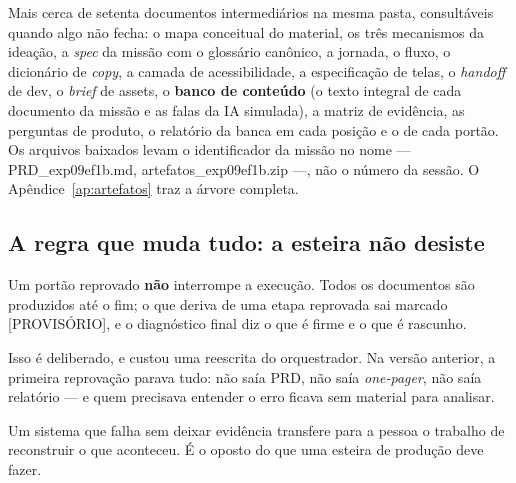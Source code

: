 \documentclass[11pt,a4paper]{article}
\newcommand{\cod}[1]{{\ttfamily\small #1}}
\begin{document}
Mais cerca de setenta documentos intermediários na mesma pasta, consultáveis quando algo não fecha: o mapa conceitual do material, os três mecanismos da ideação, a \emph{spec} da missão com o glossário canônico, a jornada, o fluxo, o dicionário de \emph{copy}, a camada de acessibilidade, a especificação de telas, o \emph{handoff} de dev, o \emph{brief} de assets, o \textbf{banco de conteúdo} (o texto integral de cada documento da missão e as falas da IA simulada), a matriz de evidência, as perguntas de produto, o relatório da banca em cada posição e o de cada portão. Os arquivos baixados levam o identificador da missão no nome --- \cod{PRD\_exp09ef1b.md}, \cod{artefatos\_exp09ef1b.zip} ---, não o número da sessão. O Apêndice~\ref{ap:artefatos} traz a árvore completa.

\subsection{A regra que muda tudo: a esteira não desiste}

Um portão reprovado \textbf{não} interrompe a execução. Todos os documentos são produzidos até o fim; o que deriva de uma etapa reprovada sai marcado \cod{[PROVISÓRIO]}, e o diagnóstico final diz o que é firme e o que é rascunho.

Isso é deliberado, e custou uma reescrita do orquestrador. Na versão anterior, a primeira reprovação parava tudo: não saía PRD, não saía \emph{one-pager}, não saía relatório --- e quem precisava entender o erro ficava sem material para analisar.

\begin{destaque}
Um sistema que falha sem deixar evidência transfere para a pessoa o trabalho de reconstruir o que aconteceu. É o oposto do que uma esteira de produção deve fazer.
\end{destaque}
\end{document}
